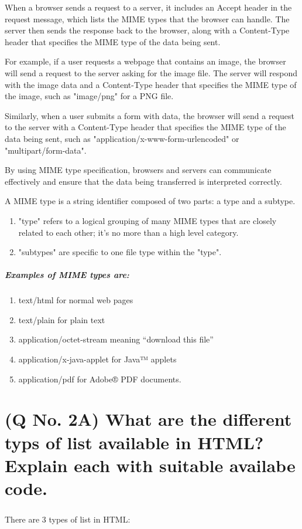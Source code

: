 \documentclass[11pt]{article}
\begin{document}
When a browser sends a request to a server, it includes an Accept header in the request message, which lists the MIME types that the browser can handle. The server then sends the response back to the browser, along with a Content-Type header that specifies the MIME type of the data being sent.

For example, if a user requests a webpage that contains an image, the browser will send a request to the server asking for the image file. The server will respond with the image data and a Content-Type header that specifies the MIME type of the image, such as "image/png" for a PNG file.

Similarly, when a user submits a form with data, the browser will send a request to the server with a Content-Type header that specifies the MIME type of the data being sent, such as "application/x-www-form-urlencoded" or "multipart/form-data".

By using MIME type specification, browsers and servers can communicate effectively and ensure that the data being transferred is interpreted correctly.

A MIME type is a string identifier composed of two parts: a type and a subtype.
\begin{enumerate}
    \item "type" refers to a logical grouping of many MIME types that are closely related to each other; it's no more than a high level category.
    \item "subtypes" are specific to one file type within the "type".
\end{enumerate}

\subparagraph{Examples of MIME types are:}
\begin{enumerate}
    \item text/html for normal web pages
    \item text/plain for plain text
    \item application/octet-stream meaning “download this file”
    \item application/x-java-applet for Java™ applets
    \item application/pdf for Adobe® PDF documents.
\end{enumerate}

\pagebreak

\section{(Q No. 2A) What are the different typs of list available in HTML? Explain each with suitable availabe code.}
\subparagraph{}
There are 3 types of list in HTML:
\end{document}
